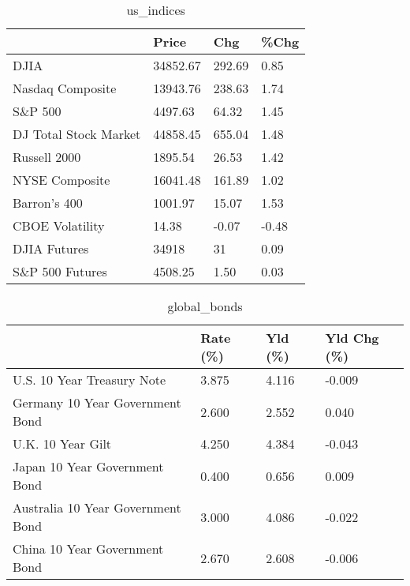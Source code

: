 \documentclass{article}%
\begin{document}
%


\begin{table}[htbp]%
\caption{us\_indices}%
\centering%
\begin{adjustbox}{width=1\textwidth}%
\begin{tabular}{llll}
\toprule
                      &    Price &    Chg &  \%Chg \\
\midrule
                 DJIA & 34852.67 & 292.69 &  0.85 \\
     Nasdaq Composite & 13943.76 & 238.63 &  1.74 \\
              S\&P 500 &  4497.63 &  64.32 &  1.45 \\
DJ Total Stock Market & 44858.45 & 655.04 &  1.48 \\
         Russell 2000 &  1895.54 &  26.53 &  1.42 \\
       NYSE Composite & 16041.48 & 161.89 &  1.02 \\
         Barron's 400 &  1001.97 &  15.07 &  1.53 \\
      CBOE Volatility &    14.38 &  -0.07 & -0.48 \\
         DJIA Futures &    34918 &     31 &  0.09 \\
      S\&P 500 Futures &  4508.25 &   1.50 &  0.03 \\
\bottomrule
\end{tabular}
%
\end{adjustbox}%
\end{table}

%


\begin{table}[htbp]%
\caption{global\_bonds}%
\centering%
\begin{adjustbox}{width=1\textwidth}%
\begin{tabular}{llll}
\toprule
                                  & Rate (\%) & Yld (\%) & Yld Chg (\%) \\
\midrule
       U.S. 10 Year Treasury Note &    3.875 &   4.116 &      -0.009 \\
  Germany 10 Year Government Bond &    2.600 &   2.552 &       0.040 \\
                U.K. 10 Year Gilt &    4.250 &   4.384 &      -0.043 \\
    Japan 10 Year Government Bond &    0.400 &   0.656 &       0.009 \\
Australia 10 Year Government Bond &    3.000 &   4.086 &      -0.022 \\
    China 10 Year Government Bond &    2.670 &   2.608 &      -0.006 \\
\bottomrule
\end{tabular}
%
\end{adjustbox}%
\end{table}
\end{document}
